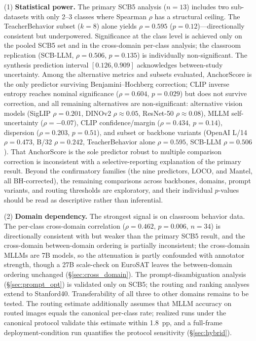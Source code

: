 \documentclass[a4paper,fleqn]{cas-sc}
\begin{document}
(1) \textbf{Statistical power.} The primary SCB5 analysis ($n=13$) includes two sub-datasets with only 2--3 classes where Spearman $\rho$ has a structural ceiling. The TeacherBehavior subset ($k=8$) alone yields $\rho=0.595$ ($p=0.12$)---directionally consistent but underpowered. Significance at the class level is achieved only on the pooled SCB5 set and in the cross-domain per-class analysis; the classroom replication (SCB-LLM, $\rho=0.506$, $p=0.135$) is individually non-significant. The synthesis prediction interval $[0.126, 0.909]$ acknowledges between-study uncertainty. Among the alternative metrics and subsets evaluated, AnchorScore is the only predictor surviving Benjamini--Hochberg correction; CLIP inverse entropy reaches nominal significance ($\rho=0.604$, $p=0.029$) but does not survive correction, and all remaining alternatives are non-significant: alternative vision models (SigLIP $\rho=0.201$, DINOv2 $\rho\approx0.05$, ResNet-50 $\rho\approx0.08$), MLLM self-uncertainty ($\rho=-0.07$), CLIP confidence/margin ($\rho=0.434$, $p=0.14$), dispersion ($\rho=0.203$, $p=0.51$), and subset or backbone variants (OpenAI L/14 $\rho=0.473$, B/32 $\rho=0.242$, TeacherBehavior alone $\rho=0.595$, SCB-LLM $\rho=0.506$). That AnchorScore is the sole predictor robust to multiple comparison correction is inconsistent with a selective-reporting explanation of the primary result. Beyond the confirmatory families (the nine predictors, LOCO, and Mantel, all BH-corrected), the remaining comparisons across backbones, domains, prompt variants, and routing thresholds are exploratory, and their individual $p$-values should be read as descriptive rather than inferential.

(2) \textbf{Domain dependency.} The strongest signal is on classroom behavior data. The per-class cross-domain correlation ($\rho=0.462$, $p=0.006$, $n=34$) is directionally consistent with but weaker than the primary SCB5 result, and the cross-domain between-domain ordering is partially inconsistent; the cross-domain MLLMs are 7B models, so the attenuation is partly confounded with annotator strength, though a 27B scale-check on EuroSAT leaves the between-domain ordering unchanged (\S\ref{sec:cross_domain}). The prompt-disambiguation analysis (\S\ref{sec:prompt_opt}) is validated only on SCB5; the routing and ranking analyses extend to Stanford40. Transferability of all three to other domains remains to be tested. The routing estimate additionally assumes that MLLM accuracy on routed images equals the canonical per-class rate; realized runs under the canonical protocol validate this estimate within 1.8~pp, and a full-frame deployment-condition run quantifies the protocol sensitivity (\S\ref{sec:hybrid}).
\end{document}
